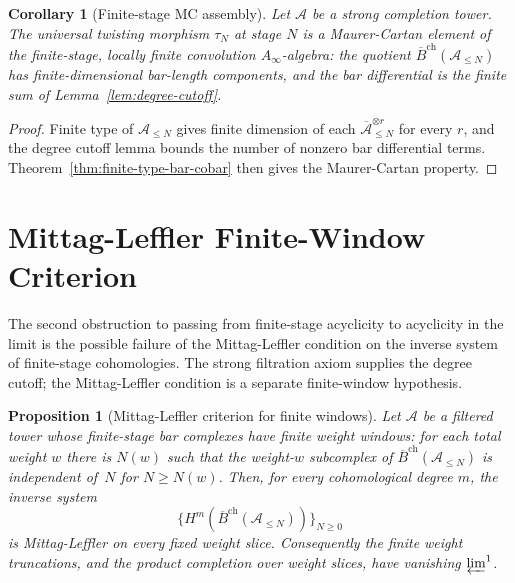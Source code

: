 \documentclass[11pt,reqno]{amsart}
\newtheorem{proposition}[theorem]{Proposition}
\newtheorem{corollary}[theorem]{Corollary}
\theoremstyle{definition}
\theoremstyle{remark}
\newcommand{\cA}{\mathcal{A}}
\newcommand{\barB}{\overline{B}}
\newcommand{\Ainf}{A_\infty}
\numberwithin{equation}{section}
\begin{document}
\begin{corollary}[Finite-stage MC assembly]
\label{cor:finite-stage-mc}
Let $\cA$ be a strong completion tower. The universal
twisting morphism $\tau_N$ at stage $N$ is a Maurer-Cartan
element of the finite-stage, locally finite convolution
$\Ainf$-algebra: the quotient
$\barB^{\mathrm{ch}}(\cA_{\le N})$ has finite-dimensional
bar-length components, and the bar differential is the finite
sum of Lemma~\ref{lem:degree-cutoff}.
\end{corollary}

\begin{proof}
Finite type of $\cA_{\le N}$ gives finite dimension of each
$\overline{\cA}_{\le N}^{\otimes r}$ for every $r$, and the
degree cutoff lemma bounds the number of nonzero bar
differential terms. Theorem~\ref{thm:finite-type-bar-cobar}
then gives the Maurer-Cartan property.
\end{proof}


\section{Mittag-Leffler Finite-Window Criterion}
\label{sec:ml}

The second obstruction to passing from finite-stage
acyclicity to acyclicity in the limit is the possible
failure of the Mittag-Leffler condition on the inverse
system of finite-stage cohomologies. The strong filtration
axiom supplies the degree cutoff; the Mittag-Leffler condition
is a separate finite-window hypothesis.

\begin{proposition}[Mittag-Leffler criterion for finite windows]
\label{prop:ml}
Let $\cA$ be a filtered tower whose finite-stage bar complexes
have finite weight windows: for each total weight $w$ there is
$N(w)$ such that the weight-$w$ subcomplex of
$\barB^{\mathrm{ch}}(\cA_{\le N})$ is independent of~$N$ for
$N\ge N(w)$. Then, for every cohomological degree $m$, the
inverse system
\[
\bigl\{H^m(\barB^{\mathrm{ch}}(\cA_{\le N}))\bigr\}_{N \ge 0}
\]
is Mittag-Leffler on every fixed weight slice. Consequently the
finite weight truncations, and the product completion over weight
slices, have vanishing $\varprojlim^1$.
\end{proposition}
\end{document}
